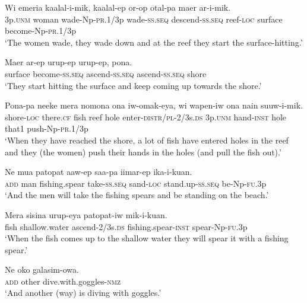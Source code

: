 \ea
\gll  Wi  emeria  kaalal-i-mik,  kaalal-ep     or-op  otal-pa  maer  ar-i-mik. \\
3p.\textsc{unm}  woman  wade{}-Np-\textsc{pr}.1/3p  wade-\textsc{ss.seq}  descend-\textsc{ss.seq}  reef-\textsc{loc}  surface  become-Np-\textsc{pr}.1/3p \\


\glt ‘The women wade, they wade down and at the reef they start the surface-hitting.’ \\
\z


\ea
\gll  Maer  ar-ep  urup-ep  urup-ep,  pona. \\
surface  become-\textsc{ss.seq}  ascend-\textsc{ss.seq}  ascend-\textsc{ss.seq}  shore \\
\glt ‘They start hitting the surface and keep coming up towards the shore.’ \\
\z


\ea
\gll  Pona-pa  neeke  mera  nomona  ona  iw-omak-eya,          wi  wapen-iw  ona  nain  suuw-i-mik. \\
shore-\textsc{loc}  there.\textsc{cf}  fish  reef  hole  enter-\textsc{distr}/\textsc{pl}-2/3s.\textsc{ds}  3p.\textsc{unm}  hand-\textsc{inst}  hole  that1  push{}-Np-\textsc{pr}.1/3p \\


\glt ‘When they have reached the shore, a lot of fish have entered holes in the reef and they (the women) push their hands in the holes (and pull the fish out).’ \\
\z


\ea
\gll  Ne  mua  patopat  aaw-ep  saa-pa  iimar-ep                  ika-i-kuan. \\
\textsc{add}  man  fishing.spear  take-\textsc{ss.seq}  sand-\textsc{loc}  stand.up-\textsc{ss.seq}   be-Np-\textsc{fu}.3p \\


\glt ‘And the men will take the fishing spears and be standing on the beach.’ \\
\z


\ea
\gll  Mera  sisina  urup-eya  patopat-iw                 mik-i-kuan. \\
fish  shallow.water  ascend-2/3s.\textsc{ds}  fishing.spear-\textsc{inst}  spear-Np-\textsc{fu}.3p \\


\glt ‘When the fish comes up to the shallow water they will spear it with a fishing spear.’ \\
\z


\ea
\gll  Ne  oko  galasim-owa. \\
\textsc{add}  other  dive.with.goggles-\textsc{nmz} \\
\glt ‘And another (way) is diving with goggles.’ \\
\z


